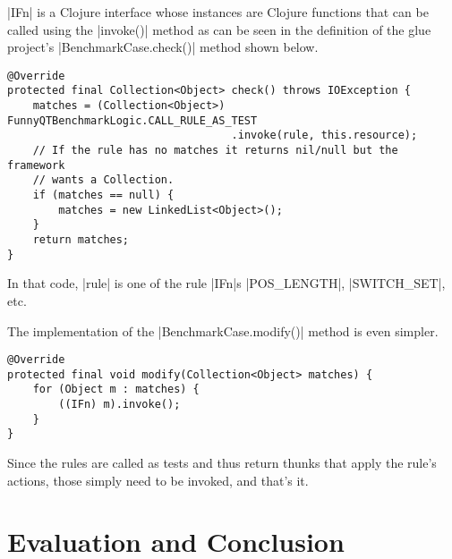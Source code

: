 \documentclass[submission]{eptcs}
\newcommand{\code}{\clojureinline}
\begin{document}
\code|IFn| is a Clojure interface whose instances are Clojure functions that
can be called using the \code|invoke()| method as can be seen in the definition
of the glue project's \code|BenchmarkCase.check()| method shown below.

\begin{verbatim}
@Override
protected final Collection<Object> check() throws IOException {
    matches = (Collection<Object>) FunnyQTBenchmarkLogic.CALL_RULE_AS_TEST
                                   .invoke(rule, this.resource);
    // If the rule has no matches it returns nil/null but the framework
    // wants a Collection.
    if (matches == null) {
        matches = new LinkedList<Object>();
    }
    return matches;
}
\end{verbatim}

In that code, \code|rule| is one of the rule \code|IFn|s \code|POS_LENGTH|,
\code|SWITCH_SET|, etc.

The implementation of the \code|BenchmarkCase.modify()| method is even simpler.

\begin{verbatim}
@Override
protected final void modify(Collection<Object> matches) {
    for (Object m : matches) {
        ((IFn) m).invoke();
    }
}
\end{verbatim}

Since the rules are called as tests and thus return thunks that apply the
rule's actions, those simply need to be invoked, and that's it.



\section{Evaluation and Conclusion}
\label{sec:evaluation}



\end{document}
